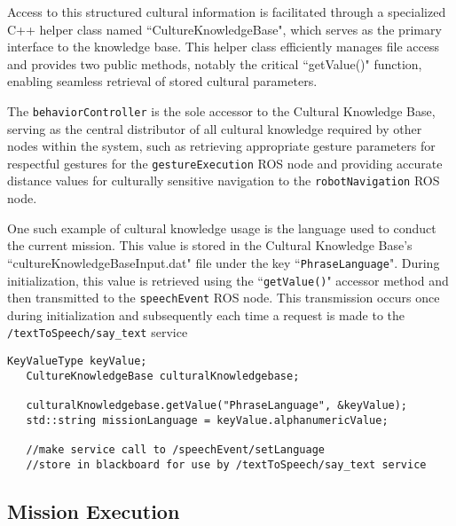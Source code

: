 \documentclass{CSSRforAfrica}
\begin{document}
Access to this structured cultural information is facilitated through a specialized C++ helper class named ``CultureKnowledgeBase", which serves as the primary interface to the knowledge base. This helper class efficiently manages file access and provides two public methods, notably the critical ``getValue()" function, enabling seamless retrieval of stored cultural parameters.

The \texttt{\small behaviorController} is the sole accessor to the Cultural Knowledge Base, serving as the central distributor of all cultural knowledge required by other nodes within the system, such as retrieving appropriate gesture parameters for respectful gestures for the \texttt{\small gestureExecution} ROS node and providing accurate distance values for culturally sensitive navigation to the \texttt{\small robotNavigation} ROS node.

One such example of cultural knowledge usage is the language used to conduct the current mission. This value is stored in the Cultural Knowledge Base's ``cultureKnowledgeBaseInput.dat" file under the key ``\texttt{\small PhraseLanguage}". During initialization, this value is retrieved using the ``\texttt{\small getValue()}" accessor method and then transmitted to the \texttt{\small speechEvent} ROS node. This transmission occurs once during initialization and subsequently each time a request is made to the \texttt{\small /textToSpeech/say\_text} service

\begin{lstlisting}[style=cppstyle]
   KeyValueType keyValue;
   CultureKnowledgeBase culturalKnowledgebase;

   culturalKnowledgebase.getValue("PhraseLanguage", &keyValue);
   std::string missionLanguage = keyValue.alphanumericValue;

   //make service call to /speechEvent/setLanguage
   //store in blackboard for use by /textToSpeech/say_text service

\end{lstlisting}

\newpage
\subsection{Mission Execution}
\end{document}
